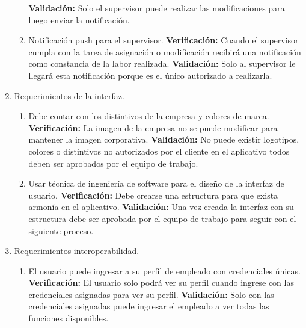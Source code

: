 \documentclass[
11pt, %
]{charter}
\begin{document}
\begin{enumerate}
\begin{enumerate}
			\newline
		    \textbf{Validación:}
		    Solo el supervisor puede realizar las modificaciones para luego enviar la notificación.
			\item Notificación push para el supervisor.
			\newline
			\textbf{Verificación:}
			Cuando el supervisor cumpla con la tarea de asignación o modificación recibirá una notificación como constancia de la labor realizada.
			\newline
		    \textbf{Validación:}
		    Solo al supervisor le llegará esta notificación porque es el único autorizado a realizarla.
		\end{enumerate}
	\item Requerimientos de la interfaz.
			\begin{enumerate}
			\item Debe contar con los distintivos de la empresa y colores de marca.
			\newline
			\textbf{Verificación:}
			La imagen de la empresa no se puede modificar para mantener la imagen corporativa.
			\newline
		    \textbf{Validación:}
		    No puede existir logotipos, colores o distintivos no autorizados por el cliente en el aplicativo todos deben ser aprobados por el equipo de trabajo. 
			\item Usar técnica de ingeniería de software para el diseño de la interfaz de usuario.
			\newline
			\textbf{Verificación:}
			Debe crearse una estructura para que exista armonía en el aplicativo.
			\newline
		    \textbf{Validación:}
		    Una vez creada la interfaz con su estructura debe ser aprobada por el equipo de trabajo para seguir con el siguiente proceso.
		\end{enumerate}
	\item Requerimientos interoperabilidad.
			\begin{enumerate}
			\item El usuario puede ingresar a su perfil de empleado con credenciales únicas.
			\newline
			\textbf{Verificación:}
			El usuario solo podrá ver su perfil cuando ingrese con las credenciales asignadas para ver su perfil.
			\newline
		    \textbf{Validación:}
		    Solo con las credenciales asignadas puede ingresar el empleado a ver todas las funciones disponibles.

\end{enumerate}
\end{enumerate}
\end{document}
